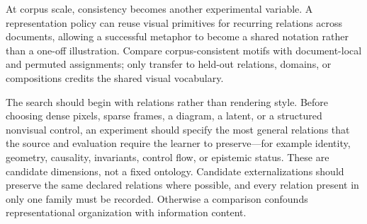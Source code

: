 \documentclass[11pt]{article}
\begin{document}
At corpus scale, consistency becomes another experimental variable. A representation policy can reuse visual primitives for recurring relations across documents, allowing a successful metaphor to become a shared notation rather than a one-off illustration. Compare corpus-consistent motifs with document-local and permuted assignments; only transfer to held-out relations, domains, or compositions credits the shared visual vocabulary.

The search should begin with relations rather than rendering style. Before choosing dense pixels, sparse frames, a diagram, a latent, or a structured nonvisual control, an experiment should specify the most general relations that the source and evaluation require the learner to preserve---for example identity, geometry, causality, invariants, control flow, or epistemic status. These are candidate dimensions, not a fixed ontology. Candidate externalizations should preserve the same declared relations where possible, and every relation present in only one family must be recorded. Otherwise a comparison confounds representational organization with information content.
\end{document}
